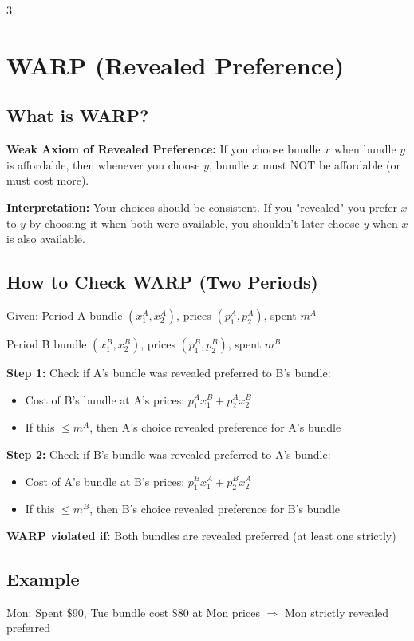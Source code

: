 \documentclass[10pt,landscape]{article}
\begin{document}
\begin{multicols}{3}
\section{WARP (Revealed Preference)}

\subsection{What is WARP?}
\textbf{Weak Axiom of Revealed Preference:} If you choose bundle $x$ when bundle $y$ is affordable, then whenever you choose $y$, bundle $x$ must NOT be affordable (or must cost more).

\textbf{Interpretation:} Your choices should be consistent. If you "revealed" you prefer $x$ to $y$ by choosing it when both were available, you shouldn't later choose $y$ when $x$ is also available.

\subsection{How to Check WARP (Two Periods)}
Given: Period A bundle $(x_1^A, x_2^A)$, prices $(p_1^A, p_2^A)$, spent $m^A$

Period B bundle $(x_1^B, x_2^B)$, prices $(p_1^B, p_2^B)$, spent $m^B$

\textbf{Step 1:} Check if A's bundle was revealed preferred to B's bundle:
\begin{itemize}[leftmargin=*,noitemsep,topsep=0pt]
\item Cost of B's bundle at A's prices: $p_1^A x_1^B + p_2^A x_2^B$
\item If this $\leq m^A$, then A's choice revealed preference for A's bundle
\end{itemize}

\textbf{Step 2:} Check if B's bundle was revealed preferred to A's bundle:
\begin{itemize}[leftmargin=*,noitemsep,topsep=0pt]
\item Cost of A's bundle at B's prices: $p_1^B x_1^A + p_2^B x_2^A$
\item If this $\leq m^B$, then B's choice revealed preference for B's bundle
\end{itemize}

\textbf{WARP violated if:} Both bundles are revealed preferred (at least one strictly)

\subsection{Example}
Mon: Spent $\$90$, Tue bundle cost $\$80$ at Mon prices $\Rightarrow$ Mon strictly revealed preferred


\end{multicols}
\end{document}
